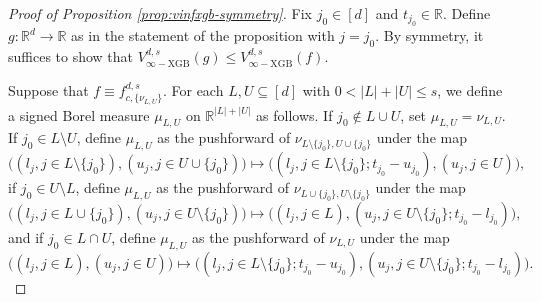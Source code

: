 \documentclass[10pt]{article}
\newcommand{\R}{{\mathbb R}}
\newcommand{\vinfxgb}{{V^{d, s}_{\infty-\text{XGB}}}}
\newcommand{\fcnu}{{f^{d, s}_{c, \{\nu_{L, U}\}}}}
\begin{document}
\begin{proof}[Proof of Proposition \ref{prop:vinfxgb-symmetry}]
Fix $j_0 \in [d]$ and $t_{j_0} \in \R$. Define $g: \R^d \to \R$ 
as in the statement of the proposition with $j = j_0$.
By symmetry, it suffices to show that $\vinfxgb(g) \le \vinfxgb(f)$.

Suppose that $f \equiv \fcnu$. For each $L,U \subseteq [d]$ with 
$0 < |L| + |U| \le s$, we define a signed Borel measure $\mu_{L, U}$ 
on $\R^{|L| + |U|}$ as follows. If $j_0 \notin L \cup U$,
set $\mu_{L, U} = \nu_{L, U}$. If $j_0 \in L \setminus U$, define 
$\mu_{L, U}$ as the pushforward of 
$\nu_{L \setminus \{j_0\}, U \cup \{j_0\}}$ under the map
\begin{equation*}
    \big((l_j, j \in L\setminus\{j_0\}), 
    (u_j, j \in U \cup \{j_0\})\big) 
    \mapsto 
    \big((l_j, j \in L\setminus\{j_0\}; t_{j_0} - u_{j_0}), 
    (u_j, j \in U)\big),
\end{equation*}
if $j_0 \in U \setminus L$, define $\mu_{L, U}$ as the 
pushforward of $\nu_{L \cup \{j_0\}, U \setminus \{j_0\}}$ under 
the map
\begin{equation*}
    \big((l_j, j \in L \cup \{j_0\}), 
    (u_j, j \in U \setminus \{j_0\})\big)
    \mapsto 
    \big((l_j, j \in L), 
    (u_j, j \in U \setminus \{j_0\}; t_{j_0} - l_{j_0})\big),
\end{equation*}
and if $j_0 \in L \cap U$, define $\mu_{L, U}$ as the pushforward 
of $\nu_{L, U}$ under the map
\begin{equation*}
    \big((l_j, j \in L), (u_j, j \in U)\big)
    \mapsto 
    \big((l_j, j \in L \setminus \{j_0\}; t_{j_0} - u_{j_0}), 
    (u_j, j \in U \setminus \{j_0\}; t_{j_0} - l_{j_0})\big).   
\end{equation*}


\end{proof}
\end{document}
